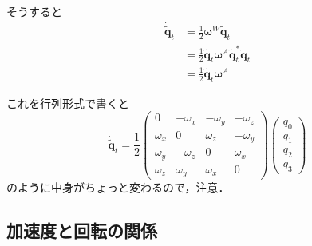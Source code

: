 そうすると
\begin{align}
  \dot{\tilde{\boldsymbol{q}}}_{t} &= \frac{1}{2} \boldsymbol{\omega}^{W} \tilde{\boldsymbol{q}}_{t}\\
  &= \frac{1}{2} \tilde{\boldsymbol{q}}_{t} \boldsymbol{\omega}^{A} \tilde{\boldsymbol{q}}^{\ast}_{t} \tilde{\boldsymbol{q}}_{t}\\
    &= \frac{1}{2} \tilde{\boldsymbol{q}}_{t} \boldsymbol{\omega}^{A}
\end{align}

これを行列形式で書くと
\begin{equation}
  \dot{\tilde{\boldsymbol{q}}}_{t} =
  \frac{1}{2}
  \begin{pmatrix}
    0        & -\omega_x & -\omega_y & -\omega_z\\
    \omega_x &         0 &  \omega_z & -\omega_y\\
    \omega_y & -\omega_z &         0 &  \omega_x\\
    \omega_z &  \omega_y &  \omega_x &         0
  \end{pmatrix}
  \begin{pmatrix}
    q_0\\
    q_1\\
    q_2\\
    q_3
  \end{pmatrix}
\end{equation}
のように中身がちょっと変わるので，注意．

\subsection{加速度と回転の関係}\label{subsec:acc}
